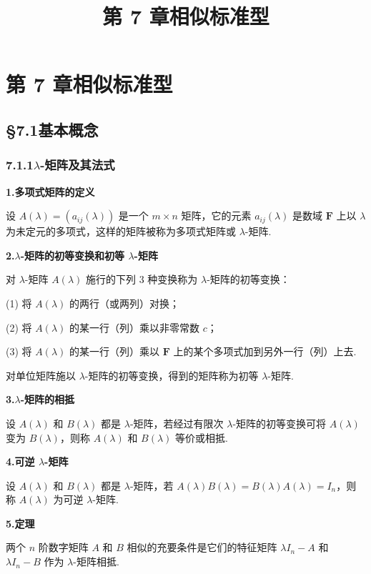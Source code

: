 \documentclass[UTF8,12pt,a4paper,fontset=fandol]{ctexart}
\title{第 7 章\quad 相似标准型}
\author{}
\date{}
\begin{document}
\maketitle

\section*{第 7 章\quad 相似标准型}

\subsection*{§7.1\quad 基本概念}

\subsubsection*{7.1.1\quad $\lambda$-矩阵及其法式}

\noindent\textbf{1.\quad 多项式矩阵的定义}

设 $A(\lambda)=(a_{ij}(\lambda))$ 是一个 $m\times n$ 矩阵，它的元素 $a_{ij}(\lambda)$ 是数域 $\mathbf{F}$ 上以 $\lambda$ 为未定元的多项式，这样的矩阵被称为多项式矩阵或 $\lambda$-矩阵.

\noindent\textbf{2.\quad $\lambda$-矩阵的初等变换和初等 $\lambda$-矩阵}

对 $\lambda$-矩阵 $A(\lambda)$ 施行的下列 3 种变换称为 $\lambda$-矩阵的初等变换：

(1) 将 $A(\lambda)$ 的两行（或两列）对换；

(2) 将 $A(\lambda)$ 的某一行（列）乘以非零常数 $c$；

(3) 将 $A(\lambda)$ 的某一行（列）乘以 $\mathbf{F}$ 上的某个多项式加到另外一行（列）上去.

对单位矩阵施以 $\lambda$-矩阵的初等变换，得到的矩阵称为初等 $\lambda$-矩阵.

\noindent\textbf{3.\quad $\lambda$-矩阵的相抵}

设 $A(\lambda)$ 和 $B(\lambda)$ 都是 $\lambda$-矩阵，若经过有限次 $\lambda$-矩阵的初等变换可将 $A(\lambda)$ 变为 $B(\lambda)$，则称 $A(\lambda)$ 和 $B(\lambda)$ 等价或相抵.

\noindent\textbf{4.\quad 可逆 $\lambda$-矩阵}

设 $A(\lambda)$ 和 $B(\lambda)$ 都是 $\lambda$-矩阵，若 $A(\lambda)B(\lambda)=B(\lambda)A(\lambda)=I_n$，则称 $A(\lambda)$ 为可逆 $\lambda$-矩阵.

\noindent\textbf{5.\quad 定理}

两个 $n$ 阶数字矩阵 $A$ 和 $B$ 相似的充要条件是它们的特征矩阵 $\lambda I_n-A$ 和 $\lambda I_n-B$ 作为 $\lambda$-矩阵相抵.
\end{document}
